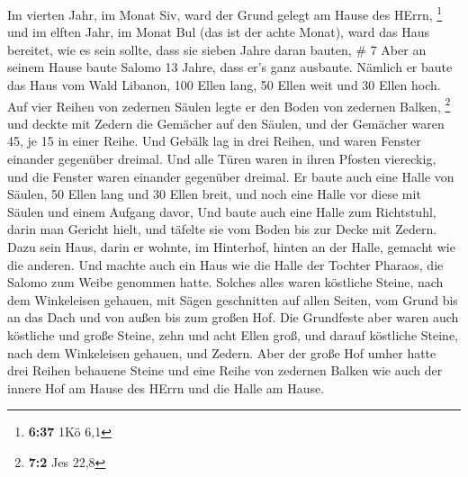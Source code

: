  Im vierten Jahr, im Monat Siv, ward der Grund gelegt am
Hause des HErrn, \footnote{\textbf{6:37} 1Kö 6,1}  und im
elften Jahr, im Monat Bul (das ist der achte Monat), ward das Haus
bereitet, wie es sein sollte, dass sie sieben Jahre daran bauten, \# 7
 Aber an seinem Hause baute Salomo 13 Jahre, dass er's ganz
ausbaute.  Nämlich er baute das Haus vom Wald Libanon, 100
Ellen lang, 50 Ellen weit und 30 Ellen hoch. Auf vier Reihen von
zedernen Säulen legte er den Boden von zedernen Balken, \footnote{\textbf{7:2}
  Jes 22,8}  und deckte mit Zedern die Gemächer auf den
Säulen, und der Gemächer waren 45, je 15 in einer Reihe. 
Und Gebälk lag in drei Reihen, und waren Fenster einander gegenüber
dreimal.  Und alle Türen waren in ihren Pfosten viereckig,
und die Fenster waren einander gegenüber dreimal.  Er baute
auch eine Halle von Säulen, 50 Ellen lang und 30 Ellen breit, und noch
eine Halle vor diese mit Säulen und einem Aufgang davor, 
Und baute auch eine Halle zum Richtstuhl, darin man Gericht hielt, und
täfelte sie vom Boden bis zur Decke mit Zedern.  Dazu sein
Haus, darin er wohnte, im Hinterhof, hinten an der Halle, gemacht wie
die anderen. Und machte auch ein Haus wie die Halle der Tochter Pharaos,
die Salomo zum Weibe genommen hatte.  Solches alles waren
köstliche Steine, nach dem Winkeleisen gehauen, mit Sägen geschnitten
auf allen Seiten, vom Grund bis an das Dach und von außen bis zum großen
Hof.  Die Grundfeste aber waren auch köstliche und große
Steine, zehn und acht Ellen groß,  und darauf köstliche
Steine, nach dem Winkeleisen gehauen, und Zedern.  Aber der
große Hof umher hatte drei Reihen behauene Steine und eine Reihe von
zedernen Balken wie auch der innere Hof am Hause des HErrn und die Halle
am Hause.

